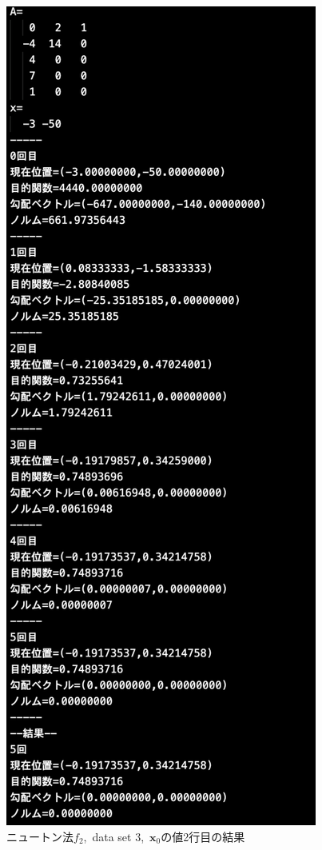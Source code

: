 \documentclass[12pt]{jarticle}
\begin{document}
\clearpage
\begin{figure}[h]
    \begin{center}
        \includegraphics[scale=0.3]{kadai1_2n_out3_2_1.png}
    \end{center}
    \caption{ニュートン法$f_2$,\ data set 3,\ $\boldsymbol{x}_0$の値2行目の結果}
\end{figure}
\end{document}
